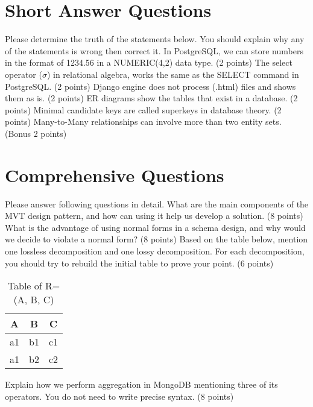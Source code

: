 \documentclass{homework}
\begin{document}
\section*{Short Answer Questions}
Please determine the truth of the statements below. You should explain why any of the statements is wrong then correct it.
\question In PostgreSQL, we can store numbers in the format of 1234.56 in a NUMERIC(4,2) data type. (2 points)
\question The select operator ($\sigma$) in relational algebra, works the same as the SELECT command in PostgreSQL. (2 points)
\question Django engine does not process (.html) files and shows them as is. (2 points)
\question ER diagrams show the tables that exist in a database. (2 points)
\question Minimal candidate keys are called superkeys in database theory. (2 points)
\question Many-to-Many relationships can involve more than two entity sets. (Bonus 2 points)

\section*{Comprehensive Questions}
Please answer following questions in detail.
\question What are the main components of the MVT design pattern, and how can using it help us develop a solution. (8 points)
\question What is the advantage of using normal forms in a schema design, and why would we decide to violate a normal form? (8 points)
\question Based on the table below, mention one lossless decomposition and one lossy decomposition. For each decomposition, you should try to rebuild the initial table to prove your point. (6 points) 
\begin{table}[!htp]
    \centering
    \begin{tabular}{|c|c|c|}
         \hline
         A & B & C\\
         \hline
         a1 & b1 & c1\\
         a1 & b2 & c2\\
         \hline
    \end{tabular}
    \caption{Table of R=(A, B, C)}
    \label{tab:my_label}
\end{table}
\question Explain how we perform aggregation in MongoDB mentioning three of its operators. You do not need to write precise syntax. (8 points)
\end{document}
